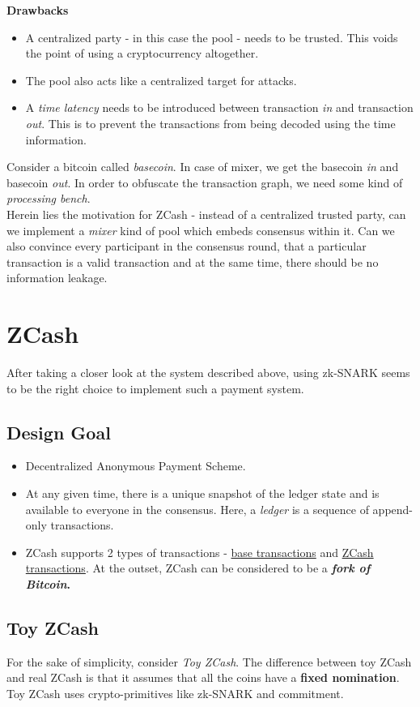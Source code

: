 \documentclass[twoside]{article}
\begin{document}
\textbf{Drawbacks}
\begin{itemize}
    \item A centralized party - in this case the pool - needs to be trusted. This voids the point of using a cryptocurrency altogether. 
    \item The pool also acts like a centralized target for attacks. 
    \item A \textit{time latency} needs to be introduced between transaction \textit{in} and transaction \textit{out}. This is to prevent the transactions from being decoded using the time information.
\end{itemize}
Consider a bitcoin called \textit{basecoin}. In case of mixer, we get the basecoin \textit{in} and basecoin \textit{out}. In order to obfuscate the transaction graph, we need some kind of \textit{processing bench}. \\

Herein lies the motivation for ZCash - instead of a centralized trusted party, can we implement a \textit{mixer} kind of pool which embeds consensus within it. Can we also convince every participant in the consensus round, that a particular transaction is a valid transaction and at the same time, there should be no information leakage. 

\section{ZCash}
After taking a closer look at the system described above, using zk-SNARK seems to be the right choice to implement such a payment system. 
\subsection{Design Goal}
\begin{itemize}
    \item Decentralized Anonymous Payment Scheme.
    \item At any given time, there is a unique snapshot of the ledger state and is available to everyone in the consensus. Here, a \textit{ledger} is a sequence of append-only transactions. 
    \item ZCash supports 2 types of transactions - \underline{base transactions} and \underline{ZCash transactions}. At the outset, ZCash can be considered to be a \textbf{\textit{fork of Bitcoin}.} 
\end{itemize}

\subsection{Toy ZCash}
For the sake of simplicity, consider \textit{Toy ZCash}. The difference between toy ZCash and real ZCash is that it assumes that all the coins have a \textbf{fixed nomination}. Toy ZCash uses crypto-primitives like zk-SNARK and commitment. 
\end{document}

